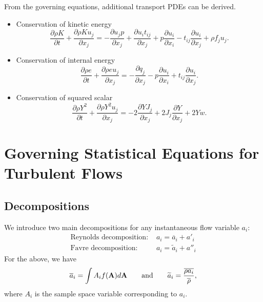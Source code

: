 \documentclass[oneside,a4paper,11pt]{report}
\newcommand{\rhoavg}{\overline{\rho}}
\newcommand{\aavg}{\overline{a}}
\newcommand{\afluc}{a'}
\newcommand{\aavgf}{\widetilde{a}}
\newcommand{\aflucf}{a''}
\begin{document}
From the governing equations, additional transport PDEs can be derived.
\begin{itemize}
\item Conservation of kinetic energy
\begin{equation}
    \label{eq:cons_kinetic_energy}
    \frac{\partial \rho K}{\partial t} + \frac{\partial \rho K u_j}{\partial x_j} = - \frac{\partial u_j p}{\partial x_j} + \frac{\partial u_i t_{ij}}{\partial x_j} + p \frac{\partial u_i}{\partial x_i} - t_{ij} \frac{\partial u_i}{\partial x_j} + \rho f_j u_j .
\end{equation}
\item Conservation of internal energy
\begin{equation}
    \label{eq:cons_internal_energy}
    \frac{ \partial \rho e}{\partial t} + \frac{\partial \rho e u_j}{\partial x_j} = -\frac{\partial q_j}{\partial x_j} - p \frac{\partial u_i}{\partial x_i} + t_{ij} \frac{\partial u_i}{\partial x_j}.
\end{equation}
\item Conservation of squared scalar
\begin{equation}
    \label{eq:cons_squared_scalar}
    \frac{\partial \rho Y^2}{\partial t} + \frac{\partial \rho Y^2 u_j}{\partial x_j} = -2\frac{\partial Y J_j}{\partial x_j} + 2J_j \frac{\partial Y}{\partial x_j} + 2 Y w.
\end{equation}
\end{itemize}

\chapter{Governing Statistical Equations for Turbulent Flows}

\section{Decompositions}

We introduce two main decompositions for any instantaneous flow variable  $a_i$:
\begin{align}
\text{Reynolds decomposition: } & a_i = \aavg_i + \afluc_i \\
\text{Favre decomposition: } & a_i = \aavgf_i + \aflucf_i
\end{align}
For the above, we have
\begin{equation} 
\aavg_i = \int A_i f(\Avec) d\Avec \qquad \text{and} \qquad \aavgf_i = \frac{\overline{ \rho a_i }}{\rhoavg},
\end{equation}
where $A_i$ is the sample space variable corresponding to $a_i$.
\end{document}
